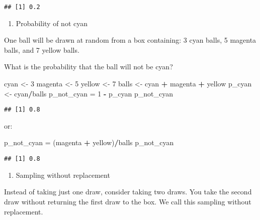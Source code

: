 \documentclass[
]{article}
\newenvironment{Shaded}{\begin{snugshade}}{\end{snugshade}}
\newcommand{\DecValTok}[1]{\textcolor[rgb]{0.00,0.00,0.81}{#1}}
\newcommand{\NormalTok}[1]{#1}
\newcommand{\OperatorTok}[1]{\textcolor[rgb]{0.81,0.36,0.00}{\textbf{#1}}}
\newcommand{\StringTok}[1]{\textcolor[rgb]{0.31,0.60,0.02}{#1}}
\providecommand{\tightlist}{%
  \setlength{\itemsep}{0pt}\setlength{\parskip}{0pt}}
\begin{document}
\begin{verbatim}
## [1] 0.2
\end{verbatim}

\begin{enumerate}
\def\labelenumi{\arabic{enumi}.}
\setcounter{enumi}{1}
\tightlist
\item
  Probability of not cyan
\end{enumerate}

One ball will be drawn at random from a box containing: 3 cyan balls, 5
magenta balls, and 7 yellow balls.

What is the probability that the ball will not be cyan?

\begin{Shaded}
\begin{Highlighting}[]
\NormalTok{cyan <-}\StringTok{ }\DecValTok{3}
\NormalTok{magenta <-}\StringTok{ }\DecValTok{5}
\NormalTok{yellow <-}\StringTok{ }\DecValTok{7}
\NormalTok{balls <-}\StringTok{ }\NormalTok{cyan }\OperatorTok{+}\StringTok{ }\NormalTok{magenta }\OperatorTok{+}\StringTok{ }\NormalTok{yellow}
\NormalTok{p_cyan <-}\StringTok{ }\NormalTok{cyan}\OperatorTok{/}\NormalTok{balls}
\NormalTok{p_not_cyan =}\StringTok{ }\DecValTok{1} \OperatorTok{-}\StringTok{ }\NormalTok{p_cyan}
\NormalTok{p_not_cyan}
\end{Highlighting}
\end{Shaded}

\begin{verbatim}
## [1] 0.8
\end{verbatim}

or:

\begin{Shaded}
\begin{Highlighting}[]
\NormalTok{p_not_cyan =}\StringTok{ }\NormalTok{(magenta }\OperatorTok{+}\StringTok{ }\NormalTok{yellow)}\OperatorTok{/}\NormalTok{balls}
\NormalTok{p_not_cyan}
\end{Highlighting}
\end{Shaded}

\begin{verbatim}
## [1] 0.8
\end{verbatim}

\begin{enumerate}
\def\labelenumi{\arabic{enumi}.}
\setcounter{enumi}{2}
\tightlist
\item
  Sampling without replacement
\end{enumerate}

Instead of taking just one draw, consider taking two draws. You take the
second draw without returning the first draw to the box. We call this
sampling without replacement.
\end{document}
